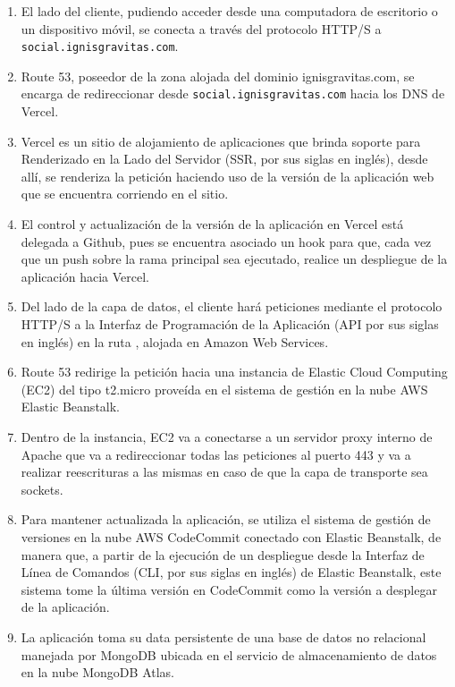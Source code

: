\begin{enumerate}
    \item El lado del cliente, pudiendo acceder desde una computadora de escritorio o un dispositivo móvil, se conecta a través del protocolo HTTP/S a \texttt{social.ignisgravitas.com}.
    \item Route 53, poseedor de la zona alojada del dominio ignisgravitas.com, se encarga de redireccionar desde \texttt{social.ignisgravitas.com} hacia los DNS de Vercel.
    \item Vercel es un sitio de alojamiento de aplicaciones que brinda soporte para Renderizado en la Lado del Servidor (SSR, por sus siglas en inglés), desde allí, se renderiza la petición haciendo uso de la versión de la aplicación web que se encuentra corriendo en el sitio.
    \item El control y actualización de la versión de la aplicación en Vercel está delegada a Github, pues se encuentra asociado un hook para que, cada vez que un push sobre la rama principal sea ejecutado, realice un despliegue de la aplicación hacia Vercel.
    \item Del lado de la capa de datos, el cliente hará peticiones mediante el protocolo HTTP/S a la Interfaz de Programación de la Aplicación (API por sus siglas en inglés) en la ruta , alojada en Amazon Web Services.
    \item Route 53 redirige la petición hacia una instancia de Elastic Cloud Computing (EC2) del tipo t2.micro proveída en el sistema de gestión en la nube AWS Elastic Beanstalk.
    \item Dentro de la instancia, EC2 va a conectarse a un servidor proxy interno de Apache que va a redireccionar todas las peticiones al puerto 443 y va a realizar reescrituras a las mismas en caso de que la capa de transporte sea sockets.
    \item Para mantener actualizada la aplicación, se utiliza el sistema de gestión de versiones en la nube AWS CodeCommit conectado con Elastic Beanstalk, de manera que, a partir de la ejecución de un despliegue desde la Interfaz de Línea de Comandos (CLI, por sus siglas en inglés) de Elastic Beanstalk, este sistema tome la última versión en CodeCommit como la versión a desplegar de la aplicación.
    \item La aplicación toma su data persistente de una base de datos no relacional manejada por MongoDB ubicada en el servicio de almacenamiento de datos en la nube MongoDB Atlas.
\end{enumerate}